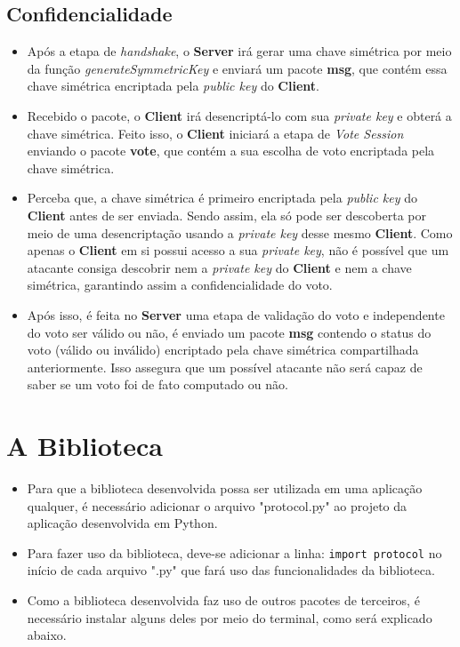 \documentclass[10pt]{article}
\begin{document}
    \subsection{Confidencialidade}
    \begin{itemize}
    \item Após a etapa de \textit{handshake}, o \textbf{Server} irá gerar uma chave simétrica por meio da função \textit{generateSymmetricKey} e enviará um pacote \textbf{msg}, que contém essa chave simétrica encriptada pela \textit{public key} do \textbf{Client}. 
    \item Recebido o pacote, o \textbf{Client} irá desencriptá-lo com sua \textit{private key} e obterá a chave simétrica. Feito isso, o \textbf{Client} iniciará a etapa de \textit{Vote Session} enviando o pacote \textbf{vote}, que contém a sua escolha de voto encriptada pela chave simétrica.
    \item Perceba que, a chave simétrica é primeiro encriptada pela \textit{public key} do \textbf{Client} antes de ser enviada. Sendo assim, ela só pode ser descoberta por meio de uma desencriptação usando a \textit{private key} desse mesmo \textbf{Client}. Como apenas o \textbf{Client} em si possui acesso a sua \textit{private key}, não é possível que um atacante consiga descobrir nem a \textit{private key} do \textbf{Client} e nem a chave simétrica, garantindo assim a confidencialidade do voto.
    \item Após isso, é feita no \textbf{Server} uma etapa de validação do voto e independente do voto ser válido ou não, é enviado um pacote \textbf{msg} contendo o status do voto (válido ou inválido) encriptado pela chave simétrica compartilhada anteriormente. Isso assegura que um possível atacante não será capaz de saber se um voto foi de fato computado ou não.
     \end{itemize}
    
\section{A Biblioteca}
    \begin{itemize}
    \item Para que a biblioteca desenvolvida possa ser utilizada em uma aplicação qualquer, é necessário adicionar o arquivo "protocol.py" ao projeto da aplicação desenvolvida em Python.
    \item Para fazer uso da biblioteca, deve-se adicionar a linha: \texttt{import protocol} no início de cada arquivo ".py" que fará uso das funcionalidades da biblioteca.
    \item Como a biblioteca desenvolvida faz uso de outros pacotes de terceiros, é necessário instalar alguns deles por meio do terminal, como será explicado abaixo.
    \end{itemize}
\end{document}

